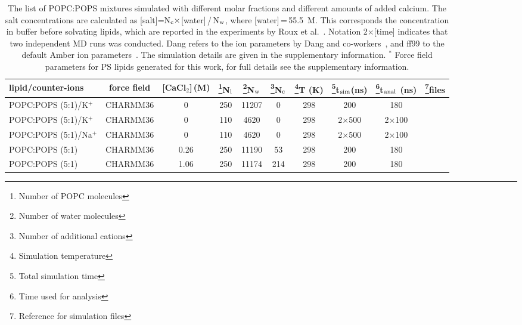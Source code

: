 \documentclass[aps,prl,superscriptaddress,twocolumn]{revtex4}
\begin{document}
\begin{table*}[tb]
\centering
\caption{The list of POPC:POPS mixtures simulated with different molar fractions and different amounts of added calcium. 
  The salt concentrations are calculated as [salt]=N$_{\rm c} \times$[water]\,/\,N$_{\rm w}$, where [water]\,=\,55.5~M.
  This corresponds the concentration in buffer before solvating lipids, which are
  reported in the experiments by Roux et al.~\cite{roux90}.
  Notation 2$\times$[time] indicates that two independent MD runs was conducted.
  Dang refers to the ion parameters by Dang and co-workers~\cite{smith94,dang06}, and ff99 to the default Amber ion parameters~\cite{aqvist90}.
  The simulation details are given in the supplementary information.
  $^*$ Force field parameters for PS lipids generated for this work, for full details see the supplementary information.
}\label{mixedIONsystems}
\begin{tabular}{lccccccccc}
lipid/counter-ions  & force field & {[}CaCl$_{2}${]}\,(M)  & \footnote{Number of POPC molecules}N$_{{\rm l}}$  & \footnote{Number of water molecules}N$_{{\rm w}}$  & \footnote{Number of additional cations}N$_{{\rm c}}$  & \footnote{Simulation temperature}T (K)  & \footnote{Total simulation time}t$_{{\rm sim}}$(ns)  & \footnote{Time used for analysis}t$_{{\rm anal}}$ (ns)  & \footnote{Reference for simulation files}files\tabularnewline
\hline 
POPC:POPS (5:1)/K$^{+}$  & CHARMM36 \cite{klauda10,venable13}  & 0  & 250  & 11207  & 0  & 298  & 200  & 180  & \cite{POPC5POPS1noCaClCHARMM} \tabularnewline
POPC:POPS (5:1)/K$^{+}$  & CHARMM36 \cite{klauda10,venable13}  & 0  & 110  & 4620  & 0  & 298  & 2$\times$500  & 2$\times$100  & \cite{charmm36pops+83popcT298Kpiggot} \tabularnewline
POPC:POPS (5:1)/Na$^{+}$  & CHARMM36 \cite{klauda10,venable13}  & 0  & 110 & 4620  & 0  & 298  & 2$\times$500  & 2$\times$100  & \cite{charmm36pops+83popcT298KpiggotSODIUM} \tabularnewline
POPC:POPS (5:1)  & CHARMM36 \cite{klauda10,venable13,kim16}  & 0.26  & 250 & 11190  & 53  & 298  & 200  & 180  & \cite{POPC5POPS1withCaClCHARMM} \tabularnewline
POPC:POPS (5:1)  & CHARMM36 \cite{klauda10,venable13,kim16}  & 1.06  & 250 & 11174  & 214  & 298  & 200  & 180  & \cite{POPC5POPS1with1MCaClCHARMM} \tabularnewline

\end{tabular}
\end{table*}
\end{document}
